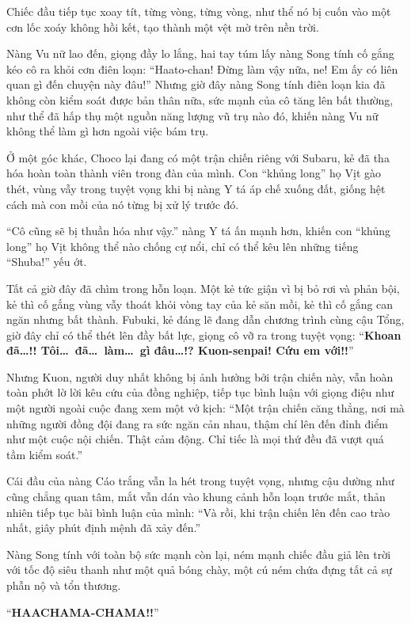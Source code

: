 \documentclass[../main.tex]{subfiles}
\begin{document}
Chiếc đầu tiếp tục xoay tít, từng vòng, từng vòng, như thể nó bị cuốn vào một cơn lốc xoáy không hồi kết, tạo thành một vệt mờ trên nền trời.

Nàng Vu nữ lao đến, giọng đầy lo lắng, hai tay túm lấy nàng Song tính cố gắng kéo cô ra khỏi cơn điên loạn: ``Haato-chan! Đừng làm vậy nữa, ne! Em ấy có liên quan gì đến chuyện này đâu!'' Nhưng giờ đây nàng Song tính điên loạn kia đã không còn kiểm soát được bản thân nữa, sức mạnh của cô tăng lên bất thường, như thể đã hấp thụ một nguồn năng lượng vũ trụ nào đó, khiến nàng Vu nữ không thể làm gì hơn ngoài việc bám trụ.

Ở một góc khác, Choco lại đang có một trận chiến riêng với Subaru, kẻ đã tha hóa hoàn toàn thành viên trong đàn của mình. Con ``khủng long'' họ Vịt gào thét, vùng vẫy trong tuyệt vọng khi bị nàng Y tá áp chế xuống đất, giống hệt cách mà con mồi của nó từng bị xử lý trước đó.

``Cô cũng sẽ bị thuần hóa như vậy.'' nàng Y tá ấn mạnh hơn, khiến con ``khủng long'' họ Vịt không thể nào chống cự nổi, chỉ có thể kêu lên những tiếng ``Shuba!'' yếu ớt.

Tất cả giờ đây đã chìm trong hỗn loạn. Một kẻ tức giận vì bị bỏ rơi và phản bội, kẻ thì cố gắng vùng vẫy thoát khỏi vòng tay của kẻ săn mồi, kẻ thì cố gắng can ngăn nhưng bất thành. Fubuki, kẻ đáng lẽ đang dẫn chương trình cùng cậu Tổng, giờ đây chỉ có thể thét lên đầy bất lực, giọng cô vỡ ra trong tuyệt vọng: ``\textbf{Khoan đã\dots!! Tôi\dots\ đã\dots\ làm\dots\ gì đâu\dots!? Kuon-senpai! Cứu em với!!}''

Nhưng Kuon, người duy nhất không bị ảnh hưởng bởi trận chiến này, vẫn hoàn toàn phớt lờ lời kêu cứu của đồng nghiệp, tiếp tục bình luận với giọng điệu như một người ngoài cuộc đang xem một vở kịch: ``Một trận chiến căng thẳng, nơi mà những người đồng đội đang ra sức ngăn cản nhau, thậm chí lên đến đỉnh điểm như một cuộc nội chiến. Thật cảm động. Chỉ tiếc là mọi thứ đều đã vượt quá tầm kiểm soát.''

Cái đầu của nàng Cáo trắng vẫn la hét trong tuyệt vọng, nhưng cậu dường như cũng chẳng quan tâm, mắt vẫn dán vào khung cảnh hỗn loạn trước mắt, thản nhiên tiếp tục bài bình luận của mình: ``Và rồi, khi trận chiến lên đến cao trào nhất, giây phút định mệnh đã xảy đến.''

Nàng Song tính với toàn bộ sức mạnh còn lại, ném mạnh chiếc đầu giả lên trời với tốc độ siêu thanh như một quả bóng chày, một cú ném chứa đựng tất cả sự phẫn nộ và tổn thương.

``{\Large\textbf{HAACHAMA-CHAMA!!}}''
\end{document}
